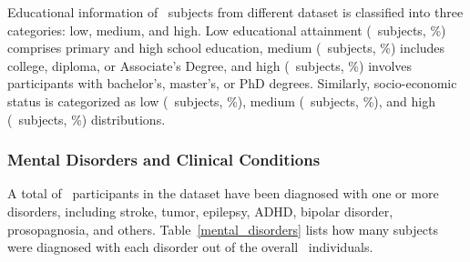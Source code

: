 Educational information of \TotalSubjectsWithEducationCount\ subjects from different dataset is classified into three categories: low, medium, and high. 
Low educational attainment (\TotalSubjectsWithLowEducationCount\ subjects, \TotalSubjectsWithLowEducationPercentage\%) comprises primary and high school education, 
medium (\TotalSubjectsWithMediumEducationCount\ subjects, \TotalSubjectsWithMediumEducationPercentage\%) includes college, diploma, or Associate's Degree, 
and high (\TotalSubjectsWithHighEducationCount\ subjects, \TotalSubjectsWithHighEducationPercentage\%) involves participants with bachelor's, master's, or PhD degrees. 
Similarly, socio-economic status is categorized as low (\TotalSubjectsWithLowEconomicCount\ subjects, \TotalSubjectsWithLowEconomicPercentage\%), 
medium (\TotalSubjectsWithMediumEconomicCount\ subjects, \TotalSubjectsWithMediumEconomicPercentage\%), and high (\TotalSubjectsWithHighEconomicCount\ subjects, 
\TotalSubjectsWithHighEconomicPercentage\%) distributions.




\subsubsection{Mental Disorders and Clinical Conditions}

A total of \TotalSubjectsWithDisordersCount\ participants in the dataset have been diagnosed with one or more disorders, including stroke, 
tumor, epilepsy, ADHD, bipolar disorder, prosopagnosia, and others. Table~\ref{mental_disorders} lists how many subjects were diagnosed 
with each disorder out of the overall \TotalSubjectsIncludedAfterInspectionCount\ individuals. 



